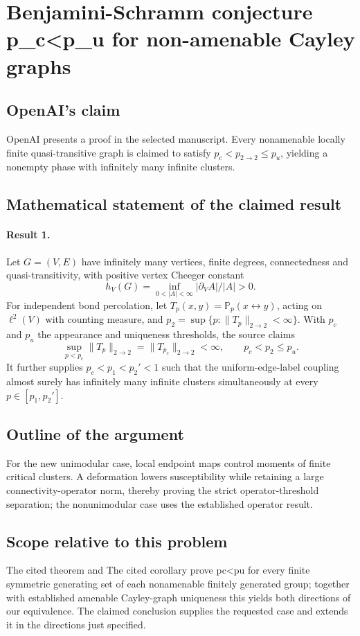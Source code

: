 \documentclass[11pt]{article}
\begin{document}
\section*{Benjamini-Schramm conjecture p\_c<p\_u for non-amenable Cayley graphs}

\subsection{OpenAI's claim}
OpenAI presents a proof in the selected manuscript. Every nonamenable locally finite quasi-transitive graph is claimed to satisfy $p_c<p_{2\to2}\leq p_u$, yielding a nonempty phase with infinitely many infinite clusters.

\subsection{Mathematical statement of the claimed result}
\paragraph{Result 1.} Let \(G=(V,E)\) have infinitely many vertices, finite degrees, connectedness and quasi-transitivity, with positive vertex Cheeger constant
\[
 h_V(G)=\inf_{0<|A|<\infty}|\partial_VA|/|A|>0.
\]
For independent bond percolation, let \(T_p(x,y)=\mathbb P_p(x\leftrightarrow y)\), acting on \(\ell^2(V)\) with counting measure, and \(p_2=\sup\{p:\|T_p\|_{2\to2}<\infty\}\). With \(p_c\) and \(p_u\) the appearance and uniqueness thresholds, the source claims
\[
 \sup_{p<p_c}\|T_p\|_{2\to2}=\|T_{p_c}\|_{2\to2}<\infty,
 \qquad p_c<p_2\le p_u.
\]
It further supplies \(p_c<p_1<p_2'<1\) such that the uniform-edge-label coupling almost surely has infinitely many infinite clusters simultaneously at every \(p\in[p_1,p_2']\).

\subsection{Outline of the argument}
For the new unimodular case, local endpoint maps control moments of finite critical clusters. A deformation lowers susceptibility while retaining a large connectivity-operator norm, thereby proving the strict operator-threshold separation; the nonunimodular case uses the established operator result.

\subsection{Scope relative to this problem}
The cited theorem and The cited corollary prove pc<pu for every finite symmetric generating set of each nonamenable finitely generated group; together with established amenable Cayley-graph uniqueness this yields both directions of our equivalence. The claimed conclusion supplies the requested case and extends it in the directions just specified.
\end{document}
